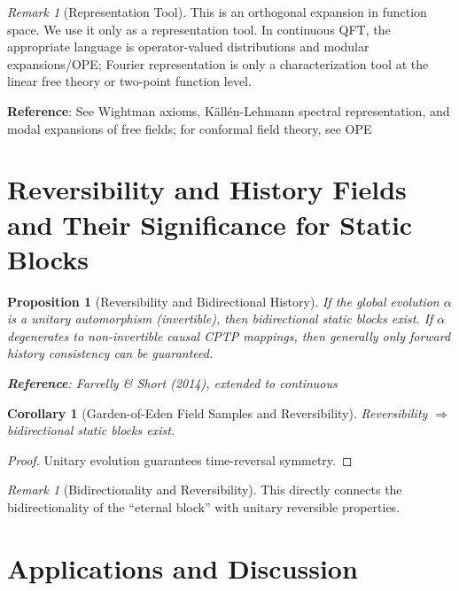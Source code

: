 \documentclass[11pt]{article}
\newtheorem{proposition}[theorem]{Proposition}
\newtheorem{corollary}[theorem]{Corollary}
\theoremstyle{definition}
\theoremstyle{remark}
\newtheorem{remark}[theorem]{Remark}
\begin{document}
\begin{remark}[Representation Tool]
This is an orthogonal expansion in function space. We use it only as a representation tool. In continuous QFT, the appropriate language is operator-valued distributions and modular expansions/OPE; Fourier representation is only a characterization tool at the linear free theory or two-point function level.

\textbf{Reference}: See Wightman axioms, Källén-Lehmann spectral representation, and modal expansions of free fields; for conformal field theory, see OPE
\end{remark}

\section{Reversibility and History Fields and Their Significance for Static Blocks}\label{sec:reversibility}

\begin{proposition}[Reversibility and Bidirectional History]\label{prop:reversibility}
If the global evolution \( \alpha \) is a unitary automorphism (invertible), then bidirectional static blocks exist. If \( \alpha \) degenerates to non-invertible causal CPTP mappings, then generally only forward history consistency can be guaranteed.

\textbf{Reference}: Farrelly \& Short (2014), extended to continuous
\end{proposition}

\begin{corollary}[Garden-of-Eden Field Samples and Reversibility]\label{cor:garden}
Reversibility \( \Rightarrow \) bidirectional static blocks exist.
\end{corollary}

\begin{proof}
Unitary evolution guarantees time-reversal symmetry.
\end{proof}

\begin{remark}[Bidirectionality and Reversibility]
This directly connects the bidirectionality of the ``eternal block'' with unitary reversible properties.
\end{remark}

\section{Applications and Discussion}\label{sec:applications}
\end{document}
